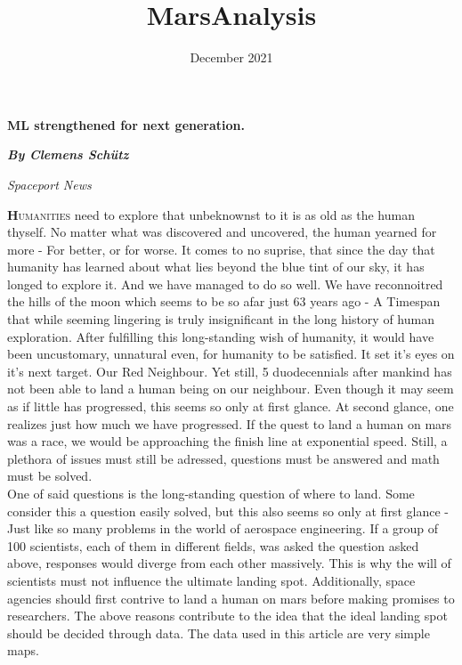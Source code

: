 \documentclass{article}
\title{MarsAnalysis}
\date{December 2021}
\begin{document}
\noindent
{\fontsize{40pt}{42pt}
    \selectfont \textbf{ML strengthened for next generation.}
}

\vspace{\baselineskip} %

\noindent %
\textbf{\emph{By Clemens Schütz}} %

\noindent %
\emph{Spaceport News}


\begin{multicols}{3}%

\noindent
\lettrine[lraise=0.1, nindent=0em, slope=-.5em]{\textbf{H}}{umanities} need
to explore that unbeknownst to it is as old as
the human thyself. 
\noindent
No matter what was discovered and uncovered, the human yearned for more - For better, or for worse. 
It comes to no suprise, that since the day that humanity has learned about what lies beyond
the blue tint of our sky, it has longed to
explore it.
And we have managed to do so well.
We have reconnoitred the hills of the moon
which seems to be so afar just 63 years ago - A Timespan that while seeming lingering is truly insignificant in the long history of human exploration.
After fulfilling this long-standing wish of humanity, it
would have been uncustomary, unnatural even, for humanity to be satisfied.
It set it's eyes on it's next target. Our Red Neighbour.
Yet still, 5 duodecennials after mankind has not been able to land a human being on our neighbour.
Even though it may seem as if little has progressed, this seems so only at first glance.
At second glance, one realizes just how much we have progressed.
If the quest to land a human on mars was a race, we would be approaching the finish line at exponential speed.
Still, a plethora of issues must still be adressed, questions must be answered and math must be solved. %
\\ %
One of said questions is the long-standing question of where to land.
Some consider this a question easily solved, but this also seems so only at first glance - Just like so many problems in the world of aerospace engineering.
If a group of 100 scientists, each of them in different fields, was asked the question asked above, responses would diverge from each other massively. 
This is why the will of scientists must not influence the ultimate landing spot.
Additionally, space agencies should first contrive to land a human on mars before making promises to researchers.
The above reasons contribute to the idea that the ideal landing spot should be decided through data.
The data used in this article are very simple maps.

\end{multicols}
\end{document}
